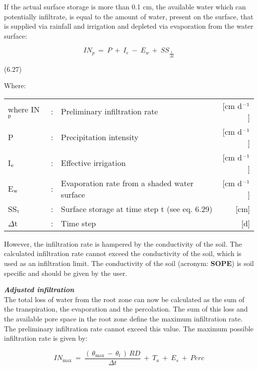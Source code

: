 If the actual surface storage is more than 0.1 cm, the available water which can potential\-ly infiltrate, is equal to the amount of water, present on the surface, that is supplied via
rainfall and irrigation and depleted via evaporation from the water surface:

\begin{equation}
IN_{p} ~=~P~+~I _{e} ~-~ E _{w~} +~ SS _{\frac{t}{\Delta t}} 
\end{equation}

 
\strut\hfill (6.27)

Where:\\
\begin{tabularx}{\textwidth}{llXr}



where IN$_{{\rm p}}$ &:& Preliminary infiltration rate  & [cm d$^{{\rm -1}}$]\\
P &:& Precipitation intensity  & [cm d$^{{\rm -1}}$]\\
I$_{{\rm e}}$ &:& Effective irrigation  & [cm d$^{{\rm -1}}$]\\
E$_{{\rm w}}$ &:& Evaporation rate from a shaded water surface  & [cm d$^{{\rm -1}}$]\\
SS$_{{\rm t}}$ &:& Surface storage at time step t (see eq. 6.29)  & [cm]\\
$\Delta$t &:& Time step  & [d]
\end{tabularx}

 
However, the infiltration rate is hampered by the conductivity of the soil. The calculated
infiltration rate cannot exceed the conductivity of the soil, which is used as an infiltration
limit. The conductivity of the soil (acronym: {\bf SOPE}) is soil specific and should be given
by the user.



{\bf {\it Adjusted infiltration\/}}\\
The total loss of water from the root zone can now be calculated as the sum of the
{\nobreak}transpiration, the evaporation and the perco\-lation. The sum of this loss and the available
pore space in the root zone define the maximum infiltra\-tion rate. The preliminary
infiltration rate cannot exceed this value. The maximum possible infiltration rate is given
by:

\begin{equation}
IN_{\max } ~=~{\frac{(\, \theta  _{\max } \, -\, \theta  _{t} \, )\, RD}{\Delta t}} ~+~ T _{a} ~+~ E _{s} ~+~ Perc
\end{equation}

